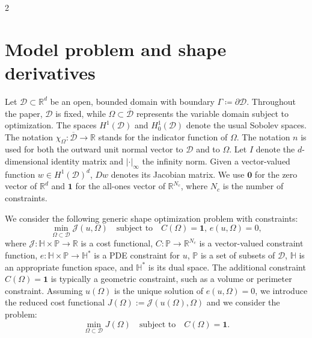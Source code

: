 \documentclass[a4paper, oneside]{article}
\newcommand{\hold}{\mathcal{D}}
\newcommand{\Om}{\Omega}
\newcommand{\R}{\mathds{R}}
\begin{document}
\begin{multicols}{2}
\section{Model problem and shape derivatives}\label{sec:shape-opt}


Let $\mathcal{D} \subset \mathds{R}^d$ be an open, bounded domain with boundary
$\Gamma \coloneqq \partial \mathcal{D}$.
Throughout the paper, $\mathcal{D}$ is fixed, while $\Om \subset \overline{\mathcal{D}}$ represents the variable domain subject to optimization.
The spaces $H^1(\mathcal{D})$ and $H^1_0(\mathcal{D})$ denote the usual Sobolev spaces.
The notation $\chi_{\Omega}:\overline{\mathcal{D}} \rightarrow \mathds{R}$ stands for
the indicator function of $\Omega$.
The notation $n$ is used for both the outward unit normal vector to $\hold$ and to $\Om$. 
Let $I$ denote the $d$-dimensional identity matrix and $\left|\cdot\right|_{\infty}$ the infinity norm.
Given a vector-valued function $w \in H^1(\mathcal{D})^d$,
$Dw$ denotes its Jacobian matrix.
We use $\boldsymbol{0}$ for the zero vector of $\mathds{R}^d$ and 
$\boldsymbol{1}$ for the all-ones vector of $\mathds{R}^{N_c}$,
where $N_c$ is the number of constraints.


We consider the following generic shape optimization problem with constraints:
\begin{equation} \label{eq:problem0}
	\min_{\Omega\subset\mathcal{D}} \mathcal{J}(u,\Omega)
	\quad \text{subject to} \quad C(\Omega) = \boldsymbol{1}, \, e(u,\Om)=0,
\end{equation}
where $\mathcal{J}: \mathbb{H}\times \mathds{P}\to\R$ is a cost functional, 
$C: \mathds{P}\to\R^{N_c}$ is a vector-valued constraint function,
$e: \mathbb{H}\times \mathds{P}\to\mathbb{H}^*$ is a PDE constraint for $u$,
$\mathds{P}$ is a set of subsets of $\hold$,
$\mathbb{H}$ is an appropriate function space, and $\mathbb{H}^*$ is its dual space.
The additional constraint $C(\Omega) = \boldsymbol{1}$ is typically a geometric constraint, such as a volume or perimeter constraint.
Assuming $u(\Om)$ is the unique solution of $e(u,\Om)=0$,  we introduce the reduced cost functional $J(\Om):= \mathcal{J}(u(\Om),\Om)$ and we consider the problem:
\begin{equation} \label{eq:problem}
	\min_{\Omega\subset\mathcal{D}} J(\Omega)
	\quad \text{subject to} \quad C(\Omega) = \boldsymbol{1}.
\end{equation}




\end{multicols}
\end{document}
